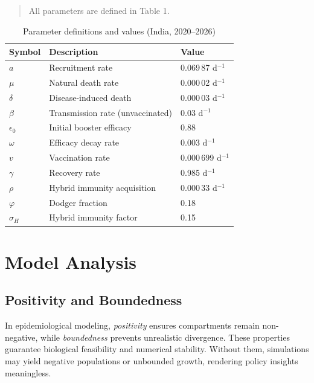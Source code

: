\documentclass[10pt]{NSP1}
\begin{document}
\begin{quote}
All parameters are defined in Table 1.
\end{quote}


\setlength{\intextsep}{6pt} 


\begin{table}[htbp]
\begin{center}
\caption{Parameter definitions and values (India, 2020--2026) \cite{ref55,ref56}}
\label{tab1}
\begin{tabular}{|p{60pt}|p{160pt}|p{85pt}|}
\hline
\textbf{Symbol} & \textbf{Description} & \textbf{Value} \\
\hline
$a$ & Recruitment rate & 0.069\,87 d$^{-1}$ \\
\hline
$\mu$ & Natural death rate & 0.000\,02 d$^{-1}$ \\
\hline
$\delta$ & Disease-induced death & 0.000\,03 d$^{-1}$ \\
\hline
$\beta$ & Transmission rate (unvaccinated) & 0.03 d$^{-1}$ \\
\hline
$\epsilon_{0}$ & Initial booster efficacy & 0.88 \\
\hline
$\omega$ & Efficacy decay rate & 0.003 d$^{-1}$ \\
\hline
$v$ & Vaccination rate & 0.000\,699 d$^{-1}$ \\
\hline
$\gamma$ & Recovery rate & 0.985 d$^{-1}$ \\
\hline
$\rho$ & Hybrid immunity acquisition & 0.000\,33 d$^{-1}$ \\
\hline
$\varphi$ & Dodger fraction & 0.18 \\
\hline
$\sigma_{H}$ & Hybrid immunity factor & 0.15 \\
\hline
\end{tabular}
\end{center}
\end{table}

\section{Model Analysis}

\subsection{Positivity and Boundedness}

In epidemiological modeling, \emph{positivity} ensures compartments remain non-negative, while \emph{boundedness} prevents unrealistic divergence. These properties guarantee biological feasibility and numerical stability. Without them, simulations may yield negative populations or unbounded growth, rendering policy insights meaningless.
\end{document}
